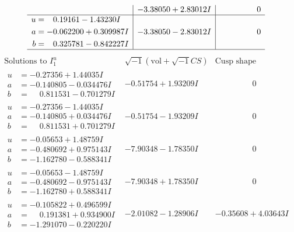 \documentclass[1p]{elsarticle_modified}
\theoremstyle{definition}
\newcommand{\I}{\sqrt{-1}}
\begin{document}
$$\begin{array}{c|c|c}
 & -3.38050 + 2.83012 I & \phantom{-0.000000 } 0 \\ \hline\begin{aligned}
u &= \phantom{-}0.19161 - 1.43230 I \\
a &= -0.062200 + 0.309987 I \\
b &= \phantom{-}0.325781 - 0.842227 I\end{aligned}
 & -3.38050 - 2.83012 I & \phantom{-0.000000 } 0\\
 \hline 
 \end{array}$$\newpage$$\begin{array}{c|c|c}  
\text{Solutions to }I^u_{1}& \I (\text{vol} + \sqrt{-1}CS) & \text{Cusp shape}\\
 \hline 
\begin{aligned}
u &= -0.27356 + 1.44035 I \\
a &= -0.140805 - 0.034476 I \\
b &= \phantom{-}0.811531 - 0.701279 I\end{aligned}
 & -0.51754 + 1.93209 I & \phantom{-0.000000 } 0 \\ \hline\begin{aligned}
u &= -0.27356 - 1.44035 I \\
a &= -0.140805 + 0.034476 I \\
b &= \phantom{-}0.811531 + 0.701279 I\end{aligned}
 & -0.51754 - 1.93209 I & \phantom{-0.000000 } 0 \\ \hline\begin{aligned}
u &= -0.05653 + 1.48759 I \\
a &= -0.480692 + 0.975143 I \\
b &= -1.162780 - 0.588341 I\end{aligned}
 & -7.90348 - 1.78350 I & \phantom{-0.000000 } 0 \\ \hline\begin{aligned}
u &= -0.05653 - 1.48759 I \\
a &= -0.480692 - 0.975143 I \\
b &= -1.162780 + 0.588341 I\end{aligned}
 & -7.90348 + 1.78350 I & \phantom{-0.000000 } 0 \\ \hline\begin{aligned}
u &= -0.105822 + 0.496599 I \\
a &= \phantom{-}0.191381 + 0.934900 I \\
b &= -1.291070 - 0.220220 I\end{aligned}
 & -2.01082 - 1.28906 I & -0.35608 + 4.03643 I \\ \hline\begin{aligned}

\end{aligned}
\end{array}$$
\end{document}
